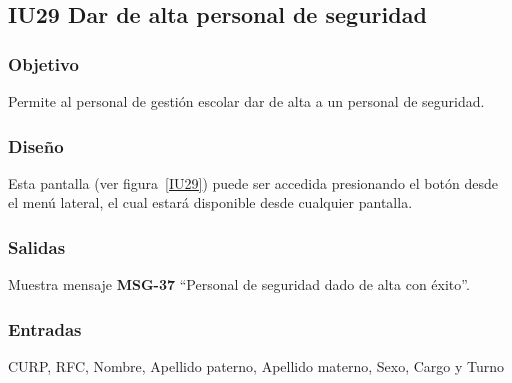 
\subsection{IU29 Dar de alta personal de seguridad}
\subsubsection{Objetivo}
    Permite al personal de gestión escolar dar de alta a un personal de seguridad.
\subsubsection{Diseño}
    Esta pantalla  (ver figura~\ref{IU29}) puede ser accedida presionando el botón  desde el menú lateral, el cual estará disponible desde cualquier pantalla.

\subsubsection{Salidas}
Muestra mensaje {\bf MSG-37} ``Personal de seguridad dado de alta con éxito''.
\subsubsection{Entradas}
CURP, RFC, Nombre, Apellido paterno, Apellido materno, Sexo, Cargo y Turno
